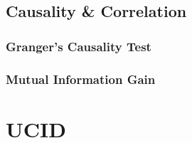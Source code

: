 \subsection{Causality \& Correlation}
\label{subsec:Exploratory-Data-Analysis:Causality-and-Correlation}

\subsubsection{Granger's Causality Test}
\label{subsubsec:Exploratory-Data-Analysis:Causality-and-Correlation:Grangers-Causality-Test}

\subsubsection{Mutual Information Gain}
\label{subsubsec:Exploratory-Data-Analysis:Causality-and-Correlation:Mutual-Information-Gain}

\section{UCID}
\label{sec:Exploratory-Data-Analysis:UCID}